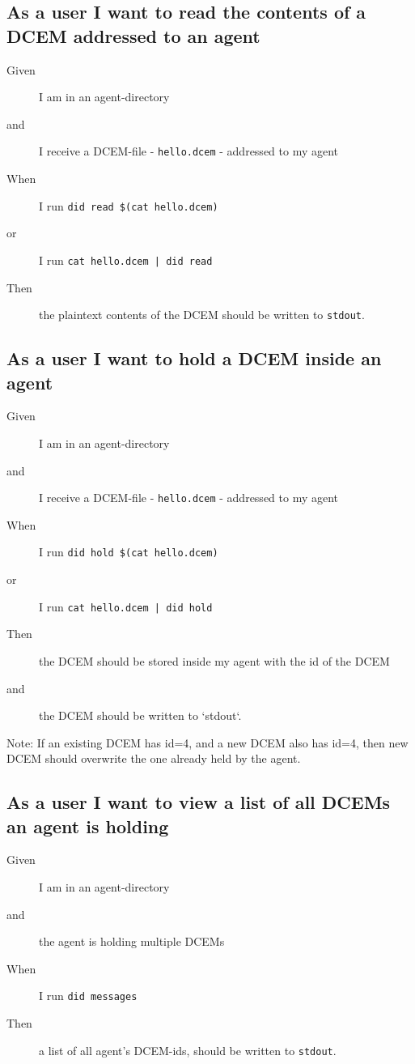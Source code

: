 \subsection{As a user I want to read the contents of a DCEM addressed to an agent}
\begin{description}\begin{description}
    \item[Given] I am in an agent-directory
    \item[and] I receive a DCEM-file - \texttt{hello.dcem} - addressed to my agent
    \item[When] I run \texttt{did read \$(cat hello.dcem)} 
    \item[or] I run \texttt{cat hello.dcem | did read}
    \item[Then] the plaintext contents of the DCEM should be written to \texttt{stdout}.
\end{description}\end{description}



\subsection{As a user I want to hold a DCEM inside an agent}
\begin{description}\begin{description}
    \item[Given] I am in an agent-directory
    \item[and] I receive a DCEM-file - \texttt{hello.dcem} - addressed to my agent
    \item[When] I run \texttt{did hold \$(cat hello.dcem)} 
    \item[or] I run \texttt{cat hello.dcem | did hold}
    \item[Then] the DCEM should be stored inside my agent with the id of the DCEM
    \item[and] the DCEM should be written to `stdout`.
\end{description}\end{description}

Note: If an existing DCEM has id=4, and a new DCEM also has id=4, then new DCEM should overwrite the one already held by the agent.



\subsection{As a user I want to view a list of all DCEMs an agent is holding}
\begin{description}\begin{description}
    \item[Given] I am in an agent-directory
    \item[and] the agent is holding multiple DCEMs
    \item[When] I run \texttt{did messages}
    \item[Then] a list of all agent's DCEM-ids, should be written to \texttt{stdout}.
\end{description}\end{description}



